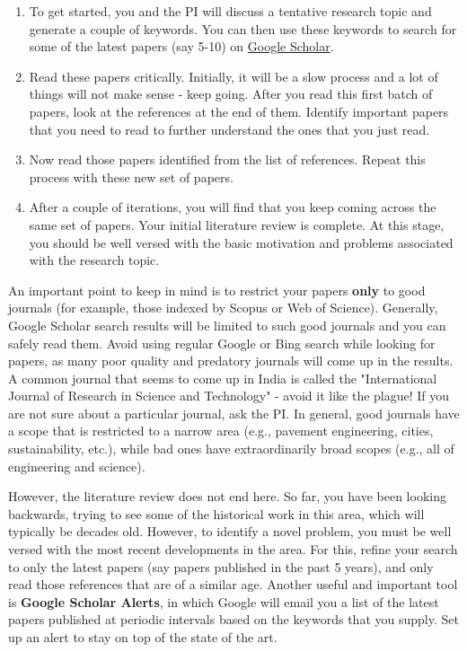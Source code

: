 \documentclass[12pt]{article}
\begin{document}
\begin{enumerate}
	\item To get started, you and the PI will discuss a tentative research topic and generate a couple of keywords. You can then use these keywords to search for some of the latest papers (say 5-10) on \href{https://scholar.google.com/}{Google Scholar}.
	\item Read these papers critically. Initially, it will be a slow process and a lot of things will not make sense - keep going. After you read this first batch of papers, look at the references at the end of them. Identify important papers that you need to read to further understand the ones that you just read.
	\item Now read those papers identified from the list of references. Repeat this process with these new set of papers.
	\item After a couple of iterations, you will find that you keep coming across the same set of papers. Your initial literature review is complete. At this stage, you should be well versed with the basic motivation and problems associated with the research topic.
\end{enumerate}

An important point to keep in mind is to restrict your papers \textbf{only} to good journals (for example, those indexed by Scopus or Web of Science). Generally, Google Scholar search results will be limited to such good journals and you can safely read them. Avoid using regular Google or Bing search while looking for papers, as many poor quality and predatory journals will come up in the results. A common journal that seems to come up in India is called the "International Journal of Research in Science and Technology" - avoid it like the plague! If you are not sure about a particular journal, ask the PI. In general, good journals have a scope that is restricted to a narrow area (e.g., pavement engineering, cities, sustainability, etc.), while bad ones have extraordinarily broad scopes (e.g., all of engineering and science). 

However, the literature review does not end here. So far, you have been looking backwards, trying to see some of the historical work in this area, which will typically be decades old. However, to identify a novel problem, you must be well versed with the most recent developments in the area. For this, refine your search to only the latest papers (say papers published in the past 5 years), and only read those references that are of a similar age. Another useful and important tool is \textbf{Google Scholar Alerts}, in which Google will email you a list of the latest papers published at periodic intervals based on the keywords that you supply. Set up an alert to stay on top of the state of the art.
\end{document}
